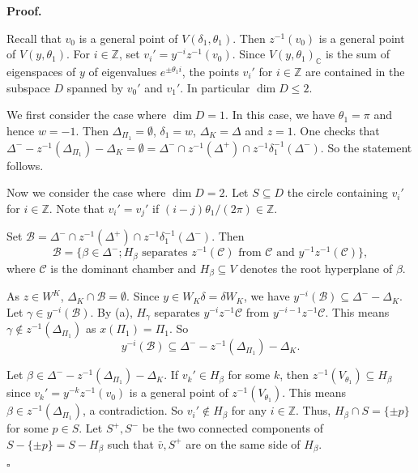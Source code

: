 \documentclass[10pt,leqno]{article}
\newcommand{\qed}{\hfill $\square$ \medskip}
\newenvironment{proof}[1][Proof]{\noindent\textbf{#1.} }{\qed}
\newcommand{\caC}{\mathcal C}
\newcommand{\g}{\mathfrak g}
\def\le{\leqslant}
\def\b{\beta}
\def\g{\gamma}
\def\d{\delta}
\def\D{\Delta}
\def\th{\theta}
\def\i{^{-1}}
\begin{document}
\begin{proof}

Recall that $v_0$ is a general point of $V(\d_1, \th_1)$. Then $z \i(v_0)$ is a general point of $V(y, \th_1)$. For $i \in \mathbb Z$, set $v_i'=y^{-i} z^{-1} (v_0)$. Since $V(y, \th_1)_{\mathbb C}$ is the sum of eigenspaces of $y$ of eigenvalues $e^{\pm \th_1 i}$,  the points $v_i'$ for $i \in \mathbb Z$ are contained in the subspace $D$ spanned by $v_0'$ and $v_1'$. In particular $\dim D \le 2$.

We first consider the case where $\dim D=1$. In this case, we have $\th_1 = \pi$ and hence $w=-1$. Then $\D_{\Pi_1} = \emptyset$, $\d_1 = w$, $\D_K = \D$ and $z=1$. One checks that $\D^- - z \i(\D_{\Pi_1})-\D_K = \emptyset = \D^- \cap z \i(\D^+) \cap z \i \d_1 \i(\D^-)$. So the statement follows.

Now we consider the case where $\dim D=2$. Let $S \subseteq D$ the circle containing $v_i'$ for $i \in \mathbb Z$. Note that $v_i'=v_j'$ if $(i-j)\th_1/(2\pi) \in \mathbb Z$.

Set $\mathcal B= \D^- \cap z \i(\D^+) \cap z \i \d_1 \i(\D^-)$. Then \[\tag{a}\mathcal B=\{\b \in \D^-; H_\b \text{ separates } z^{-1}(\caC) \text{ from } \caC \text{ and } y^{-1} z^{-1}(\caC)\},\] where $\caC$ is the dominant chamber and $H_\b \subseteq V$ denotes the root hyperplane of $\b$.

As $z \in W^K$, $\D_K \cap \mathcal B = \emptyset$. Since $y \in W_K \d =\d W_K$, we have $y^{-i}(\mathcal B) \subseteq \D^- - \D_K$. Let $\g \in y^{-i}(\mathcal B)$. By (a), $H_\g$ separates $y^{-i} z^{-1} \caC$ from $y^{-i-1} z^{-1} \caC$. This means $\g \notin z^{-1}(\D_{\Pi_1})$ as $x(\Pi_1)=\Pi_1$. So $$y^{-i}(\mathcal B) \subseteq \D^- - z^{-1}(\D_{\Pi_1}) -\D_K.$$

Let $\b \in \D^- - z^{-1}(\D_{\Pi_1}) -\D_K$. If $v_k' \in H_\b$ for some $k$, then $z^{-1}(V_{\th_1}) \subseteq H_\b$ since $v_k'=y^{-k} z^{-1}(v_0)$ is a general point of $z^{-1}(V_{\th_1})$. This means $\b \in z^{-1}(\D_{\Pi_1})$, a contradiction. So $v_i' \notin H_\b$ for any $i \in \mathbb Z$. Thus, $H_\b \cap S = \{\pm p\}$ for some $p \in S$. Let $S^+, S^-$ be the two connected components of $S - \{\pm p\}=S - H_\b$ such that $\bar v, S^+$ are on the same side of $H_\b$.


\end{proof}
\end{document}
